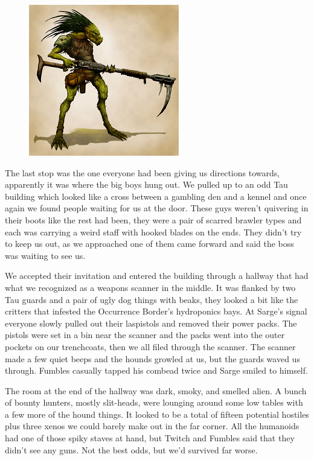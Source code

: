 \begin{figure}
	\begin{center}
		\includegraphics[width=\figwidth]{pics/10/24.png}
	\end{center}
\end{figure}
The last stop was the one everyone had been giving us directions towards, apparently it was where the big boys hung out. 
We pulled up to an odd Tau building which looked like a cross between a gambling den and a kennel and once again we found people waiting for us at the door. 
These guys weren't quivering in their boots like the rest had been, they were a pair of scarred brawler types and each was carrying a weird staff with hooked blades on the ends. 
They didn't try to keep us out, as we approached one of them came forward and said the boss was waiting to see us.

We accepted their invitation and entered the building through a hallway that had what we recognized as a weapons scanner in the middle. 
It was flanked by two Tau guards and a pair of ugly dog things with beaks, they looked a bit like the critters that infested the Occurrence Border's hydroponics bays. 
At Sarge's signal everyone slowly pulled out their laspistols and removed their power packs. 
The pistols were set in a bin near the scanner and the packs went into the outer pockets on our trenchcoats, then we all filed through the scanner. 
The scanner made a few quiet beeps and the hounds growled at us, but the guards waved us through. 
Fumbles casually tapped his combead twice and Sarge smiled to himself.

The room at the end of the hallway was dark, smoky, and smelled alien. 
A bunch of bounty hunters, mostly slit-heads, were lounging around some low tables with a few more of the hound things. 
It looked to be a total of fifteen potential hostiles plus three xenos we could barely make out in the far corner. 
All the humanoids had one of those spiky staves at hand, but Twitch and Fumbles said that they didn't see any guns. 
Not the best odds, but we'd survived far worse.

